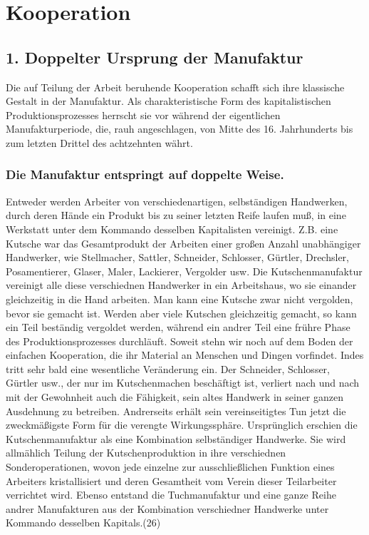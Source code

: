 

\newcommand{\num}[1]{\marginpar{#1}}

{%
\chapter{Kooperation}\label{kapitel.-kooperation}}

{%
\section{1. Doppelter Ursprung der
Manufaktur\label{doppelter-ursprung-der-manufaktur}}

\num{356} Die auf Teilung der Arbeit beruhende
Kooperation schafft sich ihre klassische Gestalt in der Manufaktur. Als
charakteristische Form des kapitalistischen Produktionsprozesses
herrscht sie vor während der eigentlichen Manufakturperiode, die, rauh
angeschlagen, von Mitte des 16. Jahrhunderts bis zum letzten Drittel des
achtzehnten währt.

{%
\subsection{Die Manufaktur entspringt auf doppelte
Weise.}\label{die-manufaktur-entspringt-auf-doppelte-weise.}}

Entweder werden Arbeiter von verschiedenartigen, selbständigen
Handwerken, durch deren Hände ein Produkt bis zu seiner letzten Reife
laufen muß, in eine Werkstatt unter dem Kommando desselben Kapitalisten
vereinigt. Z.B. eine Kutsche war das Gesamtprodukt der Arbeiten einer
großen Anzahl unabhängiger Handwerker, wie Stellmacher, Sattler,
Schneider, Schlosser, Gürtler, Drechsler, Posamentierer, Glaser, Maler,
Lackierer, Vergolder usw. Die Kutschenmanufaktur vereinigt alle diese
verschiednen Handwerker in ein Arbeitshaus, wo sie einander gleichzeitig
in die Hand arbeiten. Man kann eine Kutsche zwar nicht vergolden, bevor
sie gemacht ist. Werden aber viele Kutschen gleichzeitig gemacht, so
kann ein Teil beständig vergoldet werden, während ein andrer Teil eine
frühre Phase des Produktionsprozesses durchläuft. Soweit stehn wir noch
auf dem Boden der einfachen Kooperation, die ihr Material an Menschen
und Dingen vorfindet. Indes tritt sehr bald eine wesentliche Veränderung
ein. Der Schneider, Schlosser, Gürtler usw., der nur im Kutschenmachen
beschäftigt ist, verliert nach und nach mit der Gewohnheit auch die
Fähigkeit, sein altes Handwerk in seiner ganzen Ausdehnung zu betreiben.
Andrerseits erhält sein vereinseitigtes Tun jetzt die zweckmäßigste Form
für die verengte Wirkungssphäre. Ursprünglich erschien die
Kutschenmanufaktur als eine Kombination selbständiger Handwerke. Sie
wird allmählich Teilung der \num{357}
Kutschenproduktion in ihre verschiednen Sonderoperationen, wovon jede
einzelne zur ausschließlichen Funktion eines Arbeiters kristallisiert
und deren Gesamtheit vom Verein dieser Teilarbeiter verrichtet wird.
Ebenso entstand die Tuchmanufaktur und eine ganze Reihe andrer
Manufakturen aus der Kombination verschiedner Handwerke unter Kommando
desselben Kapitals.(26)

}
